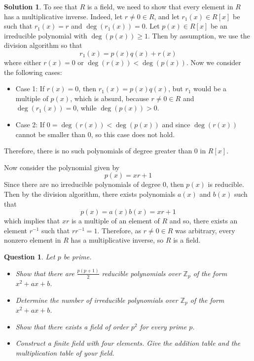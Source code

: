 \documentclass[11pt]{amsart}
\theoremstyle{}\newtheorem{question}{Question}
\theoremstyle{}\newtheorem*{bonus}{Bonus}
\theoremstyle{definition}\newtheorem*{solution}{Solution}
\newcommand{\Z}{\mathbb{Z}}
\begin{document}
\begin{solution}
    To see that $R$ is a field, we need to show that every element in $R$ has a multiplicative inverse. Indeed, let $r \neq 0 \in R$, and let $r_1(x) \in R[x]$ be such that $r_1(x) = r$ and $\deg(r_1(x)) = 0$. Let $p(x) \in R[x]$ be an irreducible polynomial with $\deg(p(x)) \geq 1$. Then by assumption, we use the division algorithm so that
    \begin{equation*}
        r_1(x) = p(x)q(x) + r(x)
    \end{equation*}
    where either $r(x) = 0$ or $\deg(r(x)) < \deg(p(x))$. Now we consider the following cases:
    \begin{itemize}
        \item Case 1: If $r(x) = 0$, then $r_1(x) = p(x)q(x)$, but $r_1$ would be a multiple of $p(x)$, which is absurd, because $r \neq 0 \in R$ and $\deg(r_1(x)) = 0$, while $\deg(p(x)) > 0$.
        \item Case 2: If $0 = \deg(r(x)) < \deg(p(x))$ and since $\deg(r(x))$ cannot be smaller than 0, so this case does not hold.
    \end{itemize}
    Therefore, there is no such polynomials of degree greater than 0 in $R[x]$.

    Now consider the polynomial given by
    \begin{equation*}
        p(x) = xr + 1
    \end{equation*}
    Since there are no irreducible polynomials of degree 0, then $p(x)$ is reducible. Then by the division algorithm, there exists polynomials $a(x)$ and $b(x)$ such that
    \begin{equation*}
        p(x) = a(x)b(x) = xr + 1
    \end{equation*}
    which implies that $xr$ is a multiple of an element of $R$ and so, there exists an element $r^{-1}$ such that $rr^{-1} = 1$. Therefore, as $r \neq 0\in R$ was arbitrary, every nonzero element in $R$ has a multiplicative inverse, so $R$ is a field.
\end{solution}

\setcounter{question}{7}

\begin{question}
    Let $p$ be prime.
    \begin{itemize}
        \item[(a)] Show that there are $\frac{p(p + 1)}{2}$ reducible polynomials over $\Z_p$ of the form $x^2 + ax + b$.
        \item[(b)] Determine the number of irreducible polynomials over $\Z_p$ of the form $x^2 + ax + b$.
        \item[(c)] Show that there exists a field of order $p^2$ for every prime $p$.
        \item[(d)] Construct a finite field with four elements. Give the addition table and the multiplication table of your field.
    \end{itemize}
\end{question}
\end{document}

